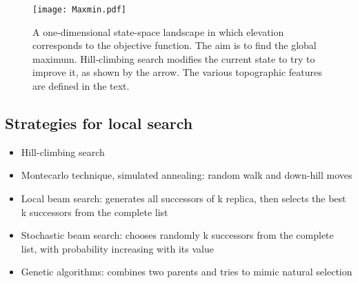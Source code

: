 \begin{figure}[h!t]
\centering
\texttt{[image: Maxmin.pdf]}
\caption{A one-dimensional state-space landscape in which elevation corresponds to the
objective function. The aim is to find the global maximum. Hill-climbing search modifies
the current state to try to improve it, as shown by the arrow. The various topographic features
are defined in the text.}
\end{figure}

\subsection{Strategies for local search}
\begin{itemize}
    \item Hill-climbing search 
    \item Montecarlo technique, simulated annealing: random walk and down-hill moves
    \item Local beam search: generates all successors of k replica, then selects the best k successors from the complete list
    \item Stochastic beam search: chooses randomly k successors from the complete list, with probability increasing with its value
    \item Genetic algorithms: combines two parents and tries to mimic natural selection
\end{itemize}
